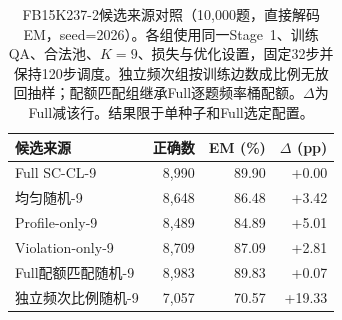 \begin{table}[htbp]
\caption{FB15K237-2候选来源对照（10,000题，直接解码EM，seed=2026）。各组使用同一Stage~1、训练QA、合法池、$K=9$、损失与优化设置，固定32步并保持120步调度。独立频次组按训练边数成比例无放回抽样；配额匹配组继承Full逐题频率桶配额。$\Delta$为Full减该行。结果限于单种子和Full选定配置。}
\label{tab:fb-controls}
\centering\small
\begin{tabular}{lrrr}
\toprule
候选来源 & 正确数 & EM (\%) & $\Delta$ (pp) \\
\midrule
Full SC-CL-9 & 8,990 & 89.90 & +0.00 \\
均匀随机-9 & 8,648 & 86.48 & +3.42 \\
Profile-only-9 & 8,489 & 84.89 & +5.01 \\
Violation-only-9 & 8,709 & 87.09 & +2.81 \\
Full配额匹配随机-9 & 8,983 & 89.83 & +0.07 \\
独立频次比例随机-9 & 7,057 & 70.57 & +19.33 \\
\bottomrule
\end{tabular}
\end{table}
